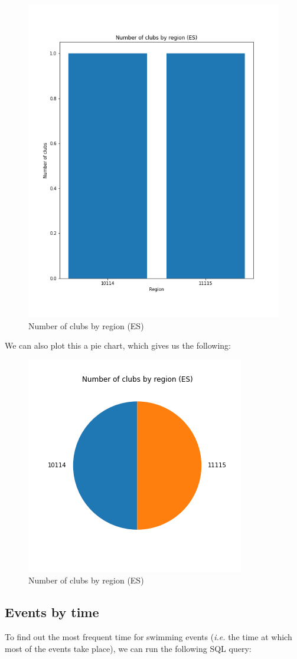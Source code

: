 \begin{figure}[H]
    \centering
    \includegraphics[width=.5\textwidth]{img/clubsbyregion-es}
    \caption{Number of clubs by region (ES)}
    \label{fig:clubs-by-region-es}
\end{figure}

We can also plot this a pie chart, which gives us the following:

\begin{figure}[H]
    \centering
    \includegraphics[width=.5\textwidth]{img/clubsbyregion-es-pie}
    \caption{Number of clubs by region (ES)}
    \label{fig:clubs-by-region-es-pie}
\end{figure}

\subsection{Events by time}

To find out the most frequent time for swimming events (\textit{i.e.} the time at which most of the events take place),
we can run the following SQL query:

